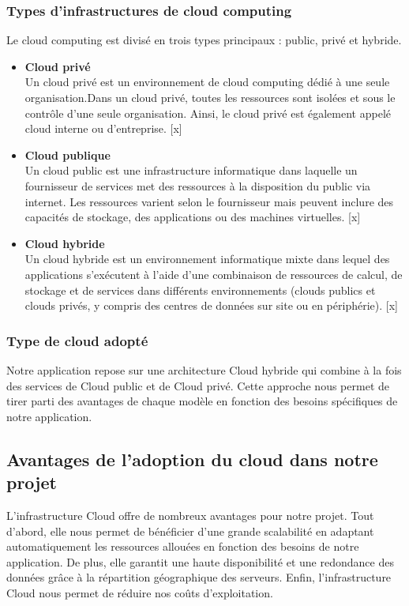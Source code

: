 \subsubsection{Types d'infrastructures de cloud computing}
\justifying
Le cloud computing est divisé en trois types principaux : public, privé et hybride.
\begin{itemize}[itemsep=2pt, parsep=2pt]
    \item \textbf{Cloud privé}\\ Un cloud privé est un environnement de cloud computing dédié à une seule organisation.Dans un cloud privé, toutes les ressources sont isolées et sous le contrôle d'une seule organisation. Ainsi, le cloud privé est également appelé cloud interne ou d'entreprise. [x]
    \item \textbf{Cloud publique}\\ Un cloud public est une infrastructure informatique dans laquelle un fournisseur de services met des ressources à la disposition du public via internet. Les ressources varient selon le fournisseur mais peuvent inclure des capacités de stockage, des applications ou des machines virtuelles. [x]
    \item \textbf{Cloud hybride}\\ Un cloud hybride est un environnement informatique mixte dans lequel des applications s'exécutent à l'aide d'une combinaison de ressources de calcul, de stockage et de services dans différents environnements (clouds publics et clouds privés, y compris des centres de données sur site ou en périphérie). [x] 

\end{itemize}

\subsubsection{Type de cloud adopté }
\justifying
Notre application repose sur une architecture Cloud hybride qui combine à la fois des services de Cloud public et de Cloud privé. Cette approche nous permet de tirer parti des avantages de chaque modèle en fonction des besoins spécifiques de notre application. 

\subsection{Avantages de l’adoption du cloud dans notre projet}
\justifying
L'infrastructure Cloud offre de nombreux avantages pour notre projet. Tout d'abord, elle nous permet de bénéficier d'une grande scalabilité en adaptant automatiquement les ressources allouées en fonction des besoins de notre application. De plus, elle garantit une haute disponibilité et une redondance des données grâce à la répartition géographique des serveurs. Enfin, l'infrastructure Cloud nous permet de réduire nos coûts d'exploitation. 

